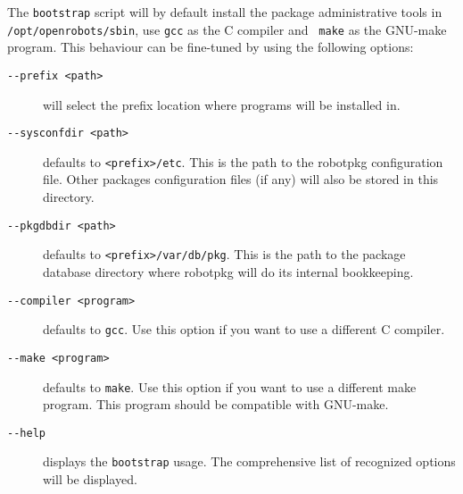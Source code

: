 The {\tt bootstrap} script will by default install the package administrative
tools in {\tt /opt/openrobots/sbin}, use {\tt gcc} as the C compiler and {\tt
make} as the GNU-make program. This behaviour can be fine-tuned by using the
following options:

\begin{description}
   \item[\tt   -{}-prefix <path>]   will   select the  prefix  location where
   programs will be installed in.

   \item[\tt -{}-sysconfdir <path>] defaults to {\tt <prefix>/etc}. This is the
   path to the robotpkg configuration file.  Other packages configuration files
   (if any) will also be stored in this directory.

   \item[\tt -{}-pkgdbdir  <path>] defaults to {\tt  <prefix>/var/db/pkg}. This
   is the path  to the package database  directory  where robotpkg will  do its
   internal bookkeeping.

   \item[\tt -{}-compiler <program>] defaults to {\tt gcc}.  Use this option if
   you want to use a different C compiler.

   \item[\tt -{}-make <program>] defaults to {\tt make}. Use this option if you
   want to use a different make program. This program should be compatible with
   GNU-make.

   \item[\tt -{}-help]  displays  the {\tt bootstrap} usage.  The comprehensive
   list of recognized options will be displayed.
\end{description}


